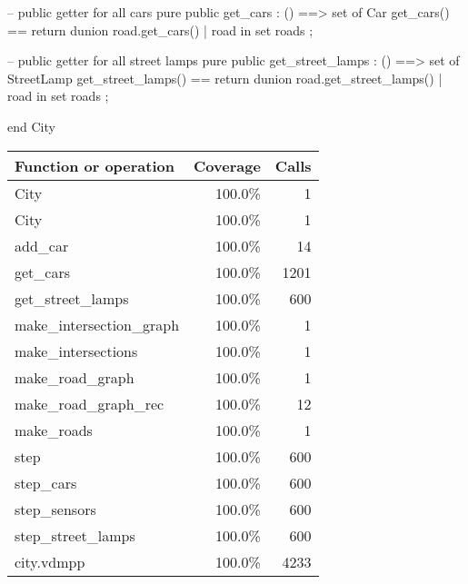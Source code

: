 \documentclass[a4paper]{article}
\begin{document}
\begin{vdm_al}
    -- public getter for all cars
    pure public get_cars : () ==> set of Car
    get_cars() ==
        return dunion {
            road.get_cars()
            | road in set roads
        };
    
    -- public getter for all street lamps
    pure public get_street_lamps : () ==> set of StreetLamp
    get_street_lamps() ==
        return dunion {
            road.get_street_lamps()
            | road in set roads
        };

end City
\end{vdm_al}
\bigskip
\begin{longtable}{|l|r|r|}
\hline
Function or operation & Coverage & Calls \\
\hline
\hline
City & 100.0\% & 1 \\
\hline
City & 100.0\% & 1 \\
\hline
add\_car & 100.0\% & 14 \\
\hline
get\_cars & 100.0\% & 1201 \\
\hline
get\_street\_lamps & 100.0\% & 600 \\
\hline
make\_intersection\_graph & 100.0\% & 1 \\
\hline
make\_intersections & 100.0\% & 1 \\
\hline
make\_road\_graph & 100.0\% & 1 \\
\hline
make\_road\_graph\_rec & 100.0\% & 12 \\
\hline
make\_roads & 100.0\% & 1 \\
\hline
step & 100.0\% & 600 \\
\hline
step\_cars & 100.0\% & 600 \\
\hline
step\_sensors & 100.0\% & 600 \\
\hline
step\_street\_lamps & 100.0\% & 600 \\
\hline
\hline
city.vdmpp & 100.0\% & 4233 \\
\hline
\end{longtable}
\end{document}
